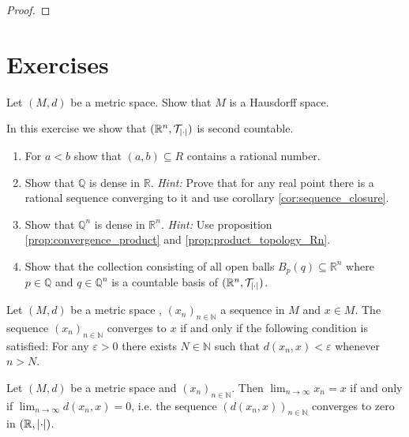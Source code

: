 \begin{proof}
	
\end{proof}

\section*{Exercises}

\begin{exercise}
	Let $(M,d)$ be a metric space. Show that $M$ is a Hausdorff space.
\end{exercise}

\begin{exercise}
	In this exercise we show that $(\mathbb{R}^n,\mathcal{T}_{\abs[0]{\cdot}})$ is second countable.

	\begin{enumerate}[label = (\alph*)]
		\item For $a < b$ show that $(a,b) \subseteq R$ contains a rational number.
		\item Show that $\mathbb{Q}$ is dense in $\mathbb{R}$. \textit{Hint:} Prove that for any real point there is a rational sequence converging to it and use corollary \ref{cor:sequence_closure}.
		\item Show that $\mathbb{Q}^n$ is dense in $\mathbb{R}^n$. \textit{Hint:} Use proposition \ref{prop:convergence_product} and \ref{prop:product_topology_Rn}.
		\item Show that the collection consisting of all open balls $B_p(q) \subseteq \mathbb{R}^n$ where $p \in \mathbb{Q}$ and $q \in \mathbb{Q}^n$ is a countable basis of $(\mathbb{R}^n,\mathcal{T}_{\abs[0]{\cdot}})$. 
	\end{enumerate}
\end{exercise}

\begin{exercise}
	Let $(M,d)$ be a metric space , $(x_n)_{n \in \mathbb{N}}$ a sequence in $M$ and $x \in M$. The sequence $(x_n)_{n \in \mathbb{N}}$ converges to $x$ if and only if the following condition is satisfied: For any $\varepsilon > 0$ there exists $N \in \mathbb{N}$ such that $d(x_n,x) < \varepsilon$ whenever $n > N$.
	\label{ex:metric_convergence}
\end{exercise}

\begin{exercise}
	Let $(M,d)$ be a metric space and $(x_n)_{n \in \mathbb{N}}$. Then $\lim_{n \to \infty} x_n = x$ if and only if $\lim_{n \to \infty} d(x_n,x) = 0$, i.e. the sequence $(d(x_n,x))_{n \in \mathbb{N}}$ converges to zero in $(\mathbb{R},\abs[0]{\cdot})$.
	\label{ex:convergence_sequence}
\end{exercise}

